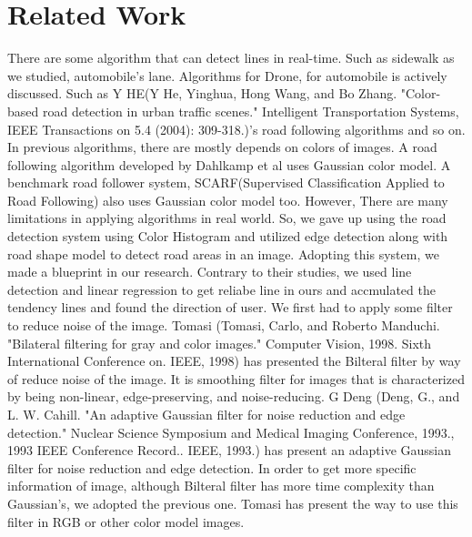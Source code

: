 \section{Related Work}
\label{sec:relatedwork}
There are some algorithm that can detect lines in real-time. Such as sidewalk as we studied, automobile's lane. Algorithms for Drone, for automobile is actively discussed. Such as Y HE(Y He, Yinghua, Hong Wang, and Bo Zhang. "Color-based road detection in urban traffic scenes." Intelligent Transportation Systems, IEEE Transactions on 5.4 (2004): 309-318.)'s road following algorithms and so on. \newline
In previous algorithms, there are mostly depends on colors of images. A road following algorithm developed by Dahlkamp et al uses Gaussian color model. A benchmark road follower system, SCARF(Supervised Classification Applied to Road Following) also uses Gaussian color model too. However, There are many limitations in applying  algorithms in real world. So, we gave up using the road detection system using Color Histogram and utilized edge detection along with road shape model to detect road areas in an image. Adopting this system, we made a blueprint in our research. Contrary to their studies, we used line detection and linear regression to get reliabe line in ours and accmulated the tendency lines and found the direction of user. \newline
We first had to apply some filter to reduce noise of the image. Tomasi (Tomasi, Carlo, and Roberto Manduchi. "Bilateral filtering for gray and color images." Computer Vision, 1998. Sixth International Conference on. IEEE, 1998) has presented the Bilteral filter by way of reduce noise of the image. It is smoothing filter for images that is characterized by being non-linear, edge-preserving, and noise-reducing. G Deng (Deng, G., and L. W. Cahill. "An adaptive Gaussian filter for noise reduction and edge detection." Nuclear Science Symposium and Medical Imaging Conference, 1993., 1993 IEEE Conference Record.. IEEE, 1993.) has present an adaptive Gaussian filter for noise reduction and edge detection. In order to get more specific information of image, although Bilteral filter has more time complexity than Gaussian's, we adopted the previous one. Tomasi has present the way to use this filter in RGB or other color model images.\newline
